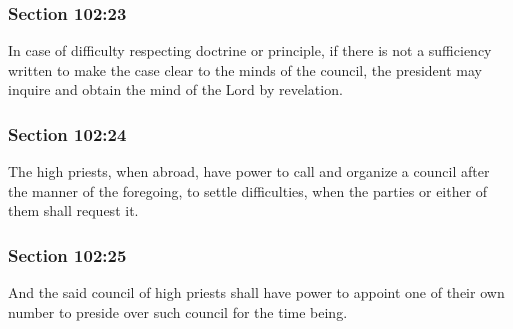 	\subsubsection{Section 102:23} %
		\label{DC102-23}

		In case of difficulty respecting doctrine or principle, if there is not a sufficiency written to make the case clear to the minds of the council, the president may inquire and obtain the mind of the Lord by revelation.


	\subsubsection{Section 102:24} %
		\label{DC102-24}

		The high priests, when abroad, have power to call and organize a council after the manner of the foregoing, to settle difficulties, when the parties or either of them shall request it.


	\subsubsection{Section 102:25} %
		\label{DC102-25}

		And the said council of high priests shall have power to appoint one of their own number to preside over such council for the time being.


